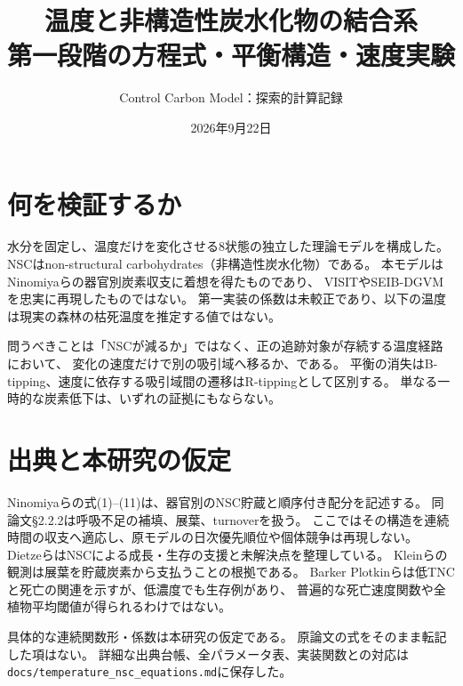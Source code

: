 \documentclass[a4paper,11pt]{ltjsarticle}
\title{温度と非構造性炭水化物の結合系\\第一段階の方程式・平衡構造・速度実験}
\author{Control Carbon Model：探索的計算記録}
\date{2026年9月22日}
\begin{document}
\maketitle
\section{何を検証するか}
水分を固定し、温度だけを変化させる8状態の独立した理論モデルを構成した。
NSCはnon-structural carbohydrates（非構造性炭水化物）である。
本モデルはNinomiyaらの器官別炭素収支に着想を得たものであり、
VISITやSEIB-DGVMを忠実に再現したものではない。
第一実装の係数は未較正であり、以下の温度は現実の森林の枯死温度を推定する値ではない。

問うべきことは「NSCが減るか」ではなく、正の追跡対象が存続する温度経路において、
変化の速度だけで別の吸引域へ移るか、である。
平衡の消失はB-tipping、速度に依存する吸引域間の遷移はR-tippingとして区別する。
単なる一時的な炭素低下は、いずれの証拠にもならない。

\section{出典と本研究の仮定}
Ninomiyaら\cite{ninomiya}の式(1)--(11)は、器官別のNSC貯蔵と順序付き配分を記述する。
同論文\S2.2.2は呼吸不足の補填、展葉、turnoverを扱う。
ここではその構造を連続時間の収支へ適応し、原モデルの日次優先順位や個体競争は再現しない。
Dietzeら\cite{dietze}はNSCによる成長・生存の支援と未解決点を整理している。
Kleinら\cite{klein}の観測は展葉を貯蔵炭素から支払うことの根拠である。
Barker Plotkinら\cite{barker}は低TNCと死亡の関連を示すが、低濃度でも生存例があり、
普遍的な死亡速度関数や全植物平均閾値が得られるわけではない。

具体的な連続関数形・係数は本研究の仮定である。
原論文の式をそのまま転記した項はない。
詳細な出典台帳、全パラメータ表、実装関数との対応は
\texttt{docs/temperature\_nsc\_equations.md}に保存した。
\end{document}
